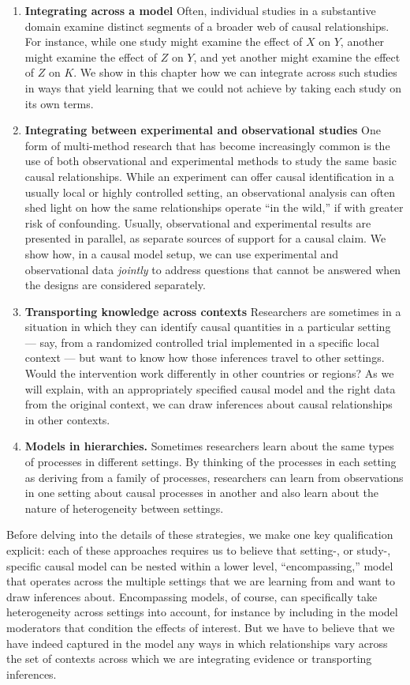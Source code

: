 \documentclass[
  12pt,
]{book}
\begin{document}
\begin{enumerate}
\def\labelenumi{\arabic{enumi}.}
\item
  \textbf{Integrating across a model} Often, individual studies in a substantive domain examine distinct segments of a broader web of causal relationships. For instance, while one study might examine the effect of \(X\) on \(Y\), another might examine the effect of \(Z\) on \(Y\), and yet another might examine the effect of \(Z\) on \(K\). We show in this chapter how we can integrate across such studies in ways that yield learning that we could not achieve by taking each study on its own terms.
\item
  \textbf{Integrating between experimental and observational studies} One form of multi-method research that has become increasingly common is the use of both observational and experimental methods to study the same basic causal relationships. While an experiment can offer causal identification in a usually local or highly controlled setting, an observational analysis can often shed light on how the same relationships operate ``in the wild,'' if with greater risk of confounding. Usually, observational and experimental results are presented in parallel, as separate sources of support for a causal claim. We show how, in a causal model setup, we can use experimental and observational data \emph{jointly} to address questions that cannot be answered when the designs are considered separately.
\item
  \textbf{Transporting knowledge across contexts} Researchers are sometimes in a situation in which they can identify causal quantities in a particular setting --- say, from a randomized controlled trial implemented in a specific local context --- but want to know how those inferences travel to other settings. Would the intervention work differently in other countries or regions? As we will explain, with an appropriately specified causal model and the right data from the original context, we can draw inferences about causal relationships in other contexts.
\item
  \textbf{Models in hierarchies.} Sometimes researchers learn about the same types of processes in different settings. By thinking of the processes in each setting as deriving from a family of processes, researchers can learn from observations in one setting about causal processes in another and also learn about the nature of heterogeneity between settings.
\end{enumerate}

Before delving into the details of these strategies, we make one key qualification explicit: each of these approaches requires us to believe that setting-, or study-, specific causal model can be nested within a lower level, ``encompassing,'' model that operates across the multiple settings that we are learning from and want to draw inferences about. Encompassing models, of course, can specifically take heterogeneity across settings into account, for instance by including in the model moderators that condition the effects of interest. But we have to believe that we have indeed captured in the model any ways in which relationships vary across the set of contexts across which we are integrating evidence or transporting inferences.
\end{document}
